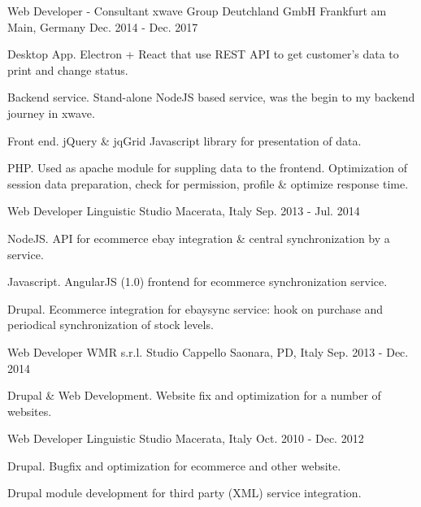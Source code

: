\begin{cventries}
  \cventry
    {Web Developer - Consultant} %
    {xwave Group Deutchland GmbH} %
    {Frankfurt am Main, Germany} %
    {Dec. 2014 - Dec. 2017} %
    {
      \begin{cvitems}
        \item {Desktop App. Electron + React that use REST API to get customer's data to print and change status.}
        \item {Backend service. Stand-alone NodeJS based service, was the begin to my backend journey in xwave.}
        \item {Front end. jQuery \& jqGrid Javascript library for presentation of data.}
        \item {PHP. Used as apache module for suppling data to the frontend. Optimization of session data preparation, check for permission, profile \& optimize response time.}
      \end{cvitems}
    }

  \cventry
    {Web Developer} %
    {Linguistic Studio} %
    {Macerata, Italy} %
    {Sep. 2013 - Jul. 2014} %
    {
      \begin{cvitems} %
        \item {NodeJS. API for ecommerce ebay integration \& central synchronization by a service.}
        \item {Javascript. AngularJS (1.0) frontend for ecommerce synchronization service.}
        \item {Drupal. Ecommerce integration for ebaysync service: hook on purchase and periodical synchronization of stock levels.}
      \end{cvitems}
    }

  \cventry
    {Web Developer} %
    {WMR s.r.l. Studio Cappello} %
    {Saonara, PD, Italy} %
    {Sep. 2013 - Dec. 2014} %
    {
      \begin{cvitems} %
        \item {Drupal \& Web Development. Website fix and optimization for a number of websites.}
      \end{cvitems}
    }

  \cventry
    {Web Developer} %
    {Linguistic Studio} %
    {Macerata, Italy} %
    {Oct. 2010 - Dec. 2012} %
    {
      \begin{cvitems} %
        \item {Drupal. Bugfix and optimization for ecommerce and other website.}
        \item {Drupal module development for third party (XML) service integration.}
      \end{cvitems}
    }


\end{cventries}
